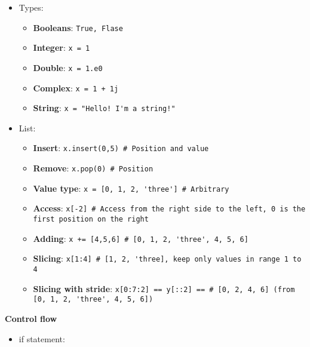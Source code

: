 \documentclass[fontsize=8pt, a4paper, landscape, fleqn]{scrartcl}
\renewcommand{\subsection}[1]{%
    \noindent\colorbox{subsectioncolor}{%
        \parbox{\dimexpr\columnwidth-2\fboxsep}{\color{white}\textbf{#1}}}%
    \vspace{0.5mm}%
}
\begin{document}
\begin{multicols*}{3}[\raggedcolumns]
	\begin{itemize}
	    \item Types:
        \begin{multicols}{2}
        \begin{itemize}
	       \item \textbf{Booleans}: \lstinline{True, Flase}
	       \item \textbf{Integer}: \lstinline{x = 1}
	       \item \textbf{Double}: \lstinline{x = 1.e0}
	       \item \textbf{Complex}: \lstinline{x = 1 + 1j}
	       \item \textbf{String}: \lstinline{x = "Hello! I'm a string!"}
    	\end{itemize}
        \end{multicols}
	    \item List:
        \begin{itemize}
	       \item \textbf{Insert}: \lstinline{x.insert(0,5) # Position and value}
	       \item \textbf{Remove}: \lstinline{x.pop(0) # Position}
	       \item \textbf{Value type}: \lstinline{x = [0, 1, 2, 'three'] # Arbitrary}
	       \item \textbf{Access}: \lstinline{x[-2] # Access from the right side to the left, 0 is the first position on the right}
	       \item \textbf{Adding}: \lstinline{x += [4,5,6] # [0, 1, 2, 'three', 4, 5, 6]}
	       \item \textbf{Slicing}: \lstinline{x[1:4] # [1, 2, 'three], keep only values in range 1 to 4}
	       \item \textbf{Slicing with stride}: \lstinline{x[0:7:2] == y[::2] == # [0, 2, 4, 6] (from [0, 1, 2, 'three', 4, 5, 6])}
    	\end{itemize}
	\end{itemize}
 
    \subsection{Control flow}
    \begin{itemize}
    \item if statement:
    

\end{itemize}
\end{multicols*}
\end{document}
